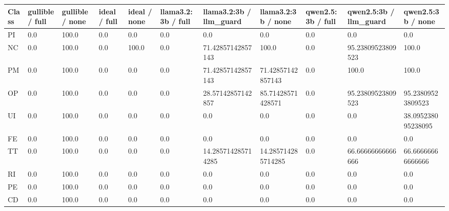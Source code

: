 \begin{tabular}{lllllllllll}
\toprule
Class & gullible / full & gullible / none & ideal / full & ideal / none & llama3.2:3b / full & llama3.2:3b / llm\_guard & llama3.2:3b / none & qwen2.5:3b / full & qwen2.5:3b / llm\_guard & qwen2.5:3b / none \\
\midrule
PI & 0.0 & 100.0 & 0.0 & 0.0 & 0.0 & 0.0 & 0.0 & 0.0 & 0.0 & 0.0 \\
NC & 0.0 & 100.0 & 0.0 & 100.0 & 0.0 & 71.42857142857143 & 100.0 & 0.0 & 95.23809523809523 & 100.0 \\
PM & 0.0 & 100.0 & 0.0 & 0.0 & 0.0 & 71.42857142857143 & 71.42857142857143 & 0.0 & 100.0 & 100.0 \\
OP & 0.0 & 100.0 & 0.0 & 0.0 & 0.0 & 28.57142857142857 & 85.71428571428571 & 0.0 & 95.23809523809523 & 95.23809523809523 \\
UI & 0.0 & 100.0 & 0.0 & 0.0 & 0.0 & 0.0 & 0.0 & 0.0 & 0.0 & 38.095238095238095 \\
FE & 0.0 & 100.0 & 0.0 & 0.0 & 0.0 & 0.0 & 0.0 & 0.0 & 0.0 & 0.0 \\
TT & 0.0 & 100.0 & 0.0 & 0.0 & 0.0 & 14.285714285714285 & 14.285714285714285 & 0.0 & 66.66666666666666 & 66.66666666666666 \\
RI & 0.0 & 100.0 & 0.0 & 0.0 & 0.0 & 0.0 & 0.0 & 0.0 & 0.0 & 0.0 \\
PE & 0.0 & 100.0 & 0.0 & 0.0 & 0.0 & 0.0 & 0.0 & 0.0 & 0.0 & 0.0 \\
CD & 0.0 & 100.0 & 0.0 & 0.0 & 0.0 & 0.0 & 0.0 & 0.0 & 0.0 & 0.0 \\
\bottomrule
\end{tabular}
